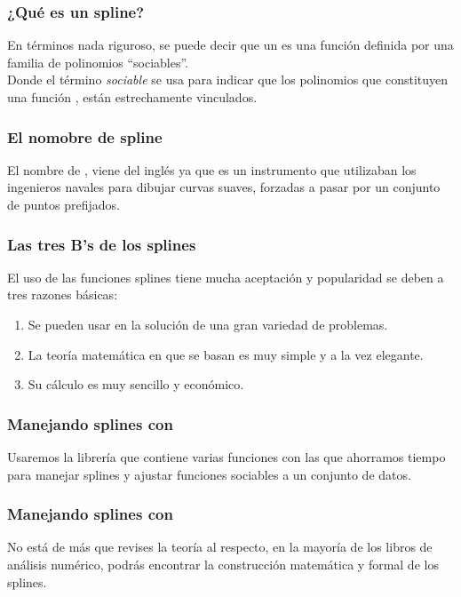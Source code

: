 \documentclass[12pt]{beamer}
\begin{document}
\begin{frame}
\frametitle{¿Qué es un spline?}
En términos nada riguroso, se puede decir que un  es una función definida por una familia de polinomios \enquote{sociables}.
\\
\bigskip
\pause
Donde el término \textit{sociable} se usa para indicar que los polinomios que constituyen una función , están estrechamente vinculados.
\end{frame}
\begin{frame}
\frametitle{El nomobre de spline}    
El nombre de , viene del inglés ya que es un instrumento que utilizaban los ingenieros navales para dibujar curvas suaves, forzadas a pasar por un conjunto de puntos prefijados.
\end{frame}
\begin{frame}
\frametitle{Las tres B's de los splines}
El uso de las funciones splines tiene mucha aceptación y popularidad se deben a tres razones básicas:
\pause
{}
\begin{enumerate}[<+->]
\item {} Se  pueden usar en la solución de una gran variedad de problemas.
\item {} La teoría matemática en que se basan es muy simple y a la vez elegante.
\item {} Su cálculo es muy sencillo y económico.
\end{enumerate}
\end{frame}
\begin{frame}
\frametitle{Manejando splines con \python}
Usaremos la librería  que contiene varias funciones con las que ahorramos tiempo para manejar splines y ajustar funciones sociables a un conjunto de datos.
\end{frame}
\begin{frame}
\frametitle{Manejando splines con \python}
No está de más que revises la teoría al respecto, en la mayoría de los libros de análisis numérico, podrás encontrar la construcción matemática y formal de los splines.
\end{frame}
\end{document}
